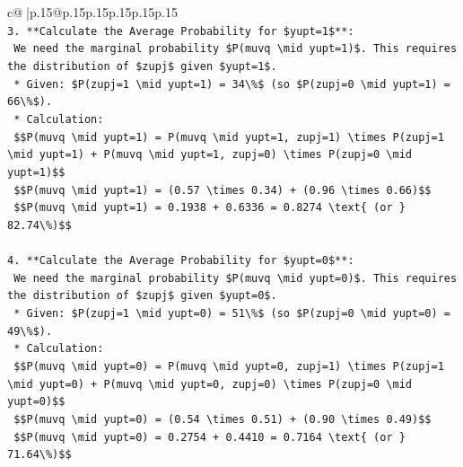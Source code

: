 \documentclass{article}
\begin{document}
{\begin{supertabular}{c@{$\;$}|p{.15\linewidth}@{}p{.15\linewidth}p{.15\linewidth}p{.15\linewidth}p{.15\linewidth}p{.15\linewidth}}
{{{\\ 
\texttt{3.  **Calculate the Average Probability for \$yupt=1\$**:} \\
\texttt{    We need the marginal probability \$P(muvq \textbackslash{}mid yupt=1)\$. This requires the distribution of \$zupj\$ given \$yupt=1\$.} \\
\texttt{    *   Given: \$P(zupj=1 \textbackslash{}mid yupt=1) = 34\textbackslash{}\%\$ (so \$P(zupj=0 \textbackslash{}mid yupt=1) = 66\textbackslash{}\%\$).} \\
\texttt{    *   Calculation:} \\
\texttt{        \$\$P(muvq \textbackslash{}mid yupt=1) = P(muvq \textbackslash{}mid yupt=1, zupj=1) \textbackslash{}times P(zupj=1 \textbackslash{}mid yupt=1) + P(muvq \textbackslash{}mid yupt=1, zupj=0) \textbackslash{}times P(zupj=0 \textbackslash{}mid yupt=1)\$\$} \\
\texttt{        \$\$P(muvq \textbackslash{}mid yupt=1) = (0.57 \textbackslash{}times 0.34) + (0.96 \textbackslash{}times 0.66)\$\$} \\
\texttt{        \$\$P(muvq \textbackslash{}mid yupt=1) = 0.1938 + 0.6336 = 0.8274 \textbackslash{}text\{ (or \} 82.74\textbackslash{}\%)\$\$} \\
\\ 
\texttt{4.  **Calculate the Average Probability for \$yupt=0\$**:} \\
\texttt{    We need the marginal probability \$P(muvq \textbackslash{}mid yupt=0)\$. This requires the distribution of \$zupj\$ given \$yupt=0\$.} \\
\texttt{    *   Given: \$P(zupj=1 \textbackslash{}mid yupt=0) = 51\textbackslash{}\%\$ (so \$P(zupj=0 \textbackslash{}mid yupt=0) = 49\textbackslash{}\%\$).} \\
\texttt{    *   Calculation:} \\
\texttt{        \$\$P(muvq \textbackslash{}mid yupt=0) = P(muvq \textbackslash{}mid yupt=0, zupj=1) \textbackslash{}times P(zupj=1 \textbackslash{}mid yupt=0) + P(muvq \textbackslash{}mid yupt=0, zupj=0) \textbackslash{}times P(zupj=0 \textbackslash{}mid yupt=0)\$\$} \\
\texttt{        \$\$P(muvq \textbackslash{}mid yupt=0) = (0.54 \textbackslash{}times 0.51) + (0.90 \textbackslash{}times 0.49)\$\$} \\
\texttt{        \$\$P(muvq \textbackslash{}mid yupt=0) = 0.2754 + 0.4410 = 0.7164 \textbackslash{}text\{ (or \} 71.64\textbackslash{}\%)\$\$} \\
\\ 
}}}
\end{supertabular}}
\end{document}
